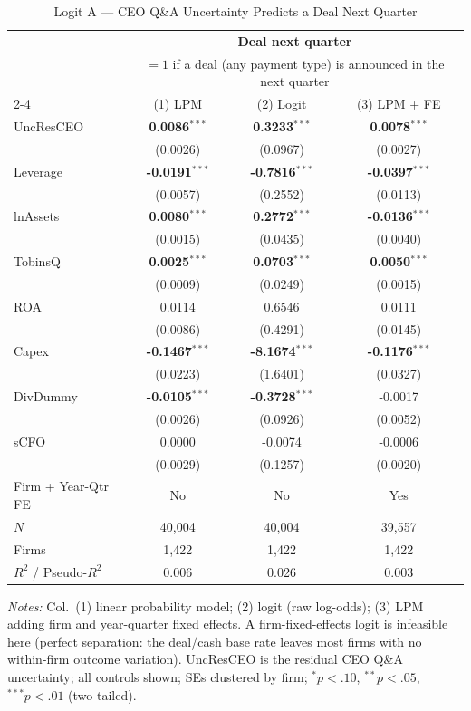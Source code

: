 \documentclass[11pt]{article}
\begin{document}
\pagestyle{empty}
\begin{table}[htbp]\centering
\caption{Logit A --- CEO Q\&A Uncertainty Predicts a Deal Next Quarter}
\label{tab:logit_dealnext}
\small\begin{tabular}{lccc}
\toprule
 & \multicolumn{3}{c}{\textbf{Deal next quarter}} \\
 & \multicolumn{3}{c}{\scriptsize $=1$ if a deal (any payment type) is announced in the next quarter} \\
\cmidrule(lr){2-4}
 & (1) LPM & (2) Logit & (3) LPM + FE \\
\midrule
UncResCEO & \textbf{0.0086}$^{***}$ & \textbf{0.3233}$^{***}$ & \textbf{0.0078}$^{***}$ \\
 & (0.0026) & (0.0967) & (0.0027) \\
\midrule
Leverage & \textbf{-0.0191}$^{***}$ & \textbf{-0.7816}$^{***}$ & \textbf{-0.0397}$^{***}$ \\
 & (0.0057) & (0.2552) & (0.0113) \\
lnAssets & \textbf{0.0080}$^{***}$ & \textbf{0.2772}$^{***}$ & \textbf{-0.0136}$^{***}$ \\
 & (0.0015) & (0.0435) & (0.0040) \\
TobinsQ & \textbf{0.0025}$^{***}$ & \textbf{0.0703}$^{***}$ & \textbf{0.0050}$^{***}$ \\
 & (0.0009) & (0.0249) & (0.0015) \\
ROA & 0.0114 & 0.6546 & 0.0111 \\
 & (0.0086) & (0.4291) & (0.0145) \\
Capex & \textbf{-0.1467}$^{***}$ & \textbf{-8.1674}$^{***}$ & \textbf{-0.1176}$^{***}$ \\
 & (0.0223) & (1.6401) & (0.0327) \\
DivDummy & \textbf{-0.0105}$^{***}$ & \textbf{-0.3728}$^{***}$ & -0.0017 \\
 & (0.0026) & (0.0926) & (0.0052) \\
sCFO & 0.0000 & -0.0074 & -0.0006 \\
 & (0.0029) & (0.1257) & (0.0020) \\
\midrule
Firm + Year-Qtr FE & No & No & Yes \\
$N$ & 40,004 & 40,004 & 39,557 \\
Firms & 1,422 & 1,422 & 1,422 \\
$R^2$ / Pseudo-$R^2$ & 0.006 & 0.026 & 0.003 \\
\bottomrule\end{tabular}
\begin{minipage}{\linewidth}\vspace{2pt}\scriptsize\textit{Notes:} Col.\ (1) linear probability model; (2) logit (raw log-odds); (3) LPM adding firm and year-quarter fixed effects. A firm-fixed-effects logit is infeasible here (perfect separation: the deal/cash base rate leaves most firms with no within-firm outcome variation). UncResCEO is the residual CEO Q\&A uncertainty; all controls shown; SEs clustered by firm; $^{*}p<.10$, $^{**}p<.05$, $^{***}p<.01$ (two-tailed).\end{minipage}
\end{table}
\end{document}
